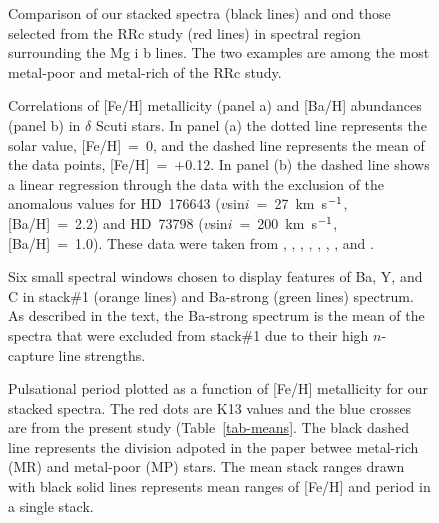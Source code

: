 \documentclass[preprint]{aastex6}
\newcommand\species[2]{#1 {\sc #2}}
\def\kmsec{\mbox{km~s$^{\rm -1}$}}
\begin{document}
\clearpage
\begin{figure}
\caption{\label{f3}
\footnotesize
   Comparison of our stacked spectra (black lines) and ond those
   selected from the \cite{sneden17} RRc study (red lines) in spectral region
   surrounding the \species{Mg}{i} b lines.
   The two examples are among the most metal-poor and metal-rich of the
   RRc study.
}
\end{figure}


\clearpage
\begin{figure}
\caption{\label{f4}
\footnotesize
   Correlations of [Fe/H] metallicity (panel a) and [Ba/H] abundances
   (panel b) in $\delta$ Scuti stars.  
   In panel (a) the dotted line represents the solar value, [Fe/H]~=~0,
   and the dashed line represents the mean of the data points, [Fe/H]~=~$+$0.12.
   In panel (b) the dashed line shows a linear regression through the data
   with the exclusion of the anomalous values 
   for HD~176643 ($v$sin$i$~=~27~\kmsec, [Ba/H]~=~2.2)
   and HD~73798 ($v$sin$i$~=~200~\kmsec, [Ba/H]~=~1.0).
   These data were taken from \cite{ishikawa75}, \cite{mittermayer03}, 
   \cite{yushchenko05}, \cite{fossati08a,fossati08b}, \cite{balona11},
   \cite{catanzaro14}, \cite{escorza16}, and \cite{joshi17}.
}
\end{figure}


\clearpage
\begin{figure}
\caption{\label{f5}
\footnotesize
   Six small spectral windows chosen to display features of Ba, Y, and C
   in stack\#1 (orange lines) and Ba-strong (green lines) spectrum.
   As described in the text, the Ba-strong spectrum is the mean of the
   spectra that were excluded from stack\#1 due to their high $n$-capture
   line strengths.
}
\end{figure}


\clearpage                                                   
\begin{figure}                                               
\caption{\label{f6}                                      
\footnotesize                                                
   Pulsational period plotted as a function of [Fe/H] metallicity
   for our stacked spectra.
   The red dots are K13 values and the blue crosses are from the present
   study (Table~\ref{tab-means}. 
   The black dashed line represents the division adpoted in the paper betwee 
   metal-rich (MR) and metal-poor (MP) stars.
   The mean stack ranges drawn with black solid lines represents mean ranges
   of [Fe/H] and period in a single stack.
}                                                            
\end{figure} 
\end{document}
